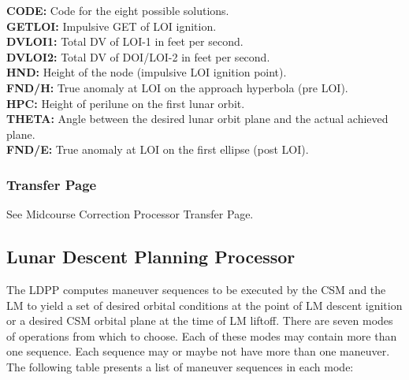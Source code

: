 \documentclass[11pt]{article} %
\begin{document}
\textbf{CODE:} Code for the eight possible solutions.\\
\textbf{GETLOI:} Impulsive GET of LOI ignition.\\
\textbf{DVLOI1:} Total DV of LOI-1 in feet per second.\\
\textbf{DVLOI2:} Total DV of DOI/LOI-2 in feet per second.\\
\textbf{HND:} Height of the node (impulsive LOI ignition point).\\
\textbf{FND/H:} True anomaly at LOI on the approach hyperbola (pre LOI).\\
\textbf{HPC:} Height of perilune on the first lunar orbit.\\
\textbf{THETA:} Angle between the desired lunar orbit plane and the actual achieved plane.\\
\textbf{FND/E:} True anomaly at LOI on the first ellipse (post LOI).\\
\newpage
\subsubsection{Transfer Page} 
See Midcourse Correction Processor Transfer Page.\\
\newpage
\subsection{Lunar Descent Planning Processor}
The LDPP computes maneuver sequences to be executed by the CSM and the LM to yield a set of desired orbital conditions at the point of LM descent ignition or a desired CSM orbital plane at the time of LM liftoff. There are seven modes of operations from which to choose. Each of these modes may contain more than one sequence. Each sequence may or maybe not have more than one maneuver. The following table presents a list of maneuver sequences in each mode:\\
\end{document}
